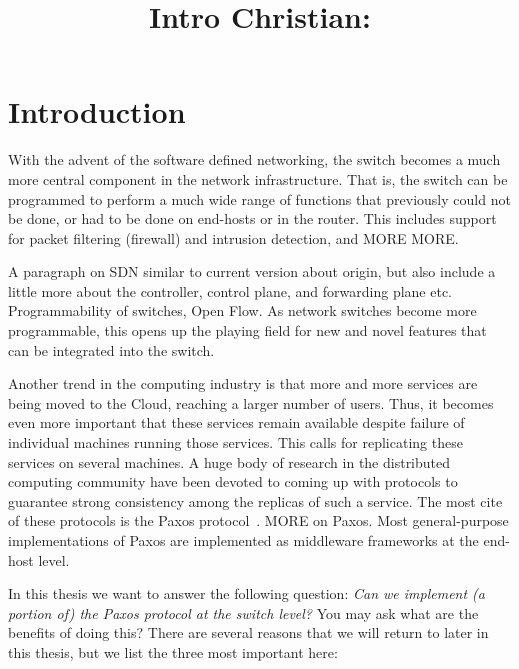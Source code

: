 \documentclass{article}
\title{Intro Christian:}
\begin{document}
\section{Introduction}

With the advent of the software defined networking, the switch becomes a
much more central component in the network infrastructure. That is, the
switch can be programmed to perform a much wide range of functions that
previously could not be done, or had to be done on end-hosts or in the
router. This includes support for packet filtering (firewall) and intrusion
detection, and MORE MORE.

A paragraph on SDN similar to current version about origin, but also include
a little more about the controller, control plane, and forwarding plane etc.
Programmability of switches, Open Flow.
%
As network switches become more programmable, this opens up the playing
field for new and novel features that can be integrated into the switch. 

Another trend in the computing industry is that more and more services are
being moved to the Cloud, reaching a larger number of users. Thus, it
becomes even more important that these services remain available despite
failure of individual machines running those services. This calls for
replicating these services on several machines. A huge body of research in
the distributed computing community have been devoted to coming up with
protocols to guarantee strong consistency among the replicas of such a
service. The most cite of these protocols is the Paxos protocol~\cite{pms}. 
%
MORE on Paxos. Most general-purpose implementations of Paxos are implemented
as middleware frameworks at the end-host level.

In this thesis we want to answer the following question: \emph{Can we
  implement (a portion of) the Paxos protocol at the switch level?}
%
You may ask what are the benefits of doing this? There are several reasons
that we will return to later in this thesis, but we list the three most
important here:
\end{document}
